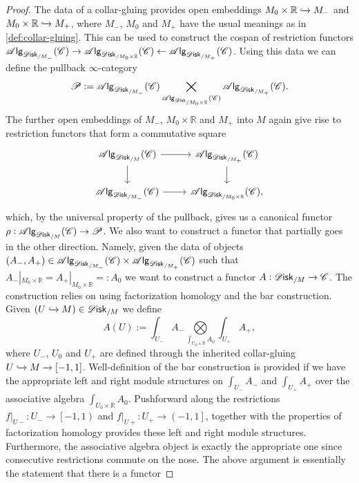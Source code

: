 \documentclass[../text]{subfiles}
\begin{document}
\begin{proof}
    The data of a collar-gluing provides open embeddings $M_0 \times \mathbb{R} \xhookrightarrow{} M_-$ and $M_0 \times \mathbb{R} \xhookrightarrow{} M_+$, where $M_-$, $M_0$ and $M_+$ have the usual meanings as in \cref{def:collar-gluing}. This can be used to construct the cospan of restriction functors $\alg{\disk_{/M_-}} (\catC) \rightarrow \alg{\disk_{/M_0 \times \mathbb{R}}} (\catC) \leftarrow \alg{\disk_{/M_+}} (\catC)$. Using this data we can define the pullback $\infty$-category
    \begin{equation}
        \mathscr{P} := \alg{\disk_{/M_-}} (\catC) \bigtimes_{\alg{\disk_{/M_0 \times \mathbb{R}}} (\catC)} \alg{\disk_{/M_+}} (\catC).
    \end{equation}
    The further open embeddings of $M_-$, $M_0 \times \mathbb{R}$ and $M_+$ into $M$ again give rise to restriction functors that form a commutative square
    \begin{equation}
        \begin{tikzcd}
            \alg{\disk_{/M}} (\catC) \arrow[r] \arrow[d] & \alg{\disk_{/M_+}} (\catC) \arrow[d] \\
            \alg{\disk_{/M_-}} (\catC) \arrow[r]           & \alg{\disk_{/M_0 \times \mathbb{R}}} (\catC),     
        \end{tikzcd}
    \end{equation}
    which, by the universal property of the pullback, gives us a canonical functor $\rho: \alg{\disk_{/M}} (\catC) \rightarrow \mathscr{P}$. We also want to construct a functor that partially goes in the other direction. Namely, given the data of objects $(A_-, A_+) \in \alg{\disk_{/M_-}} (\catC) \times \alg{\disk_{/M_+}} (\catC)$ such that $A_-|_{M_0 \times \mathbb{R}} = A_+|_{M_0 \times \mathbb{R}} = : A_0$ we want to construct a functor $A: \disk_{/M} \xrightarrow{} \catC$. The construction relies on using factorization homology and the bar construction. Given $(U \xhookrightarrow{} M) \in \disk_{/M}$ we define
    \begin{equation}\label{eq:def_of_A_in_proof}
        A(U) := \int_{U_-} A_- \bigotimes\limits_{\int_{U_0 \times \mathbb{R}} A_0} \int_{U_+} A_+,
    \end{equation}
    where $U_-$, $U_0$ and $U_+$ are defined through the inherited collar-gluing $U \xhookrightarrow{} M \xrightarrow{} [-1,1]$. Well-definition of the bar construction is provided if we have the appropriate left and right module structures on $\int_{U_-} A_-$ and $\int_{U_+} A_+$ over the associative algebra $\int_{U_0 \times \mathbb{R}} A_0$. Pushforward along the restrictions $f|_{U-}: U_- \rightarrow \left[-1, 1\right)$ and $f|_{U+}: U_+ \rightarrow \left(-1, 1\right]$, together with the properties of factorization homology provides these left and right module structures. Furthermore, the associative algebra object is exactly the appropriate one since consecutive restrictions commute on the nose. The above argument is essentially the statement that there is a functor

\end{proof}
\end{document}
